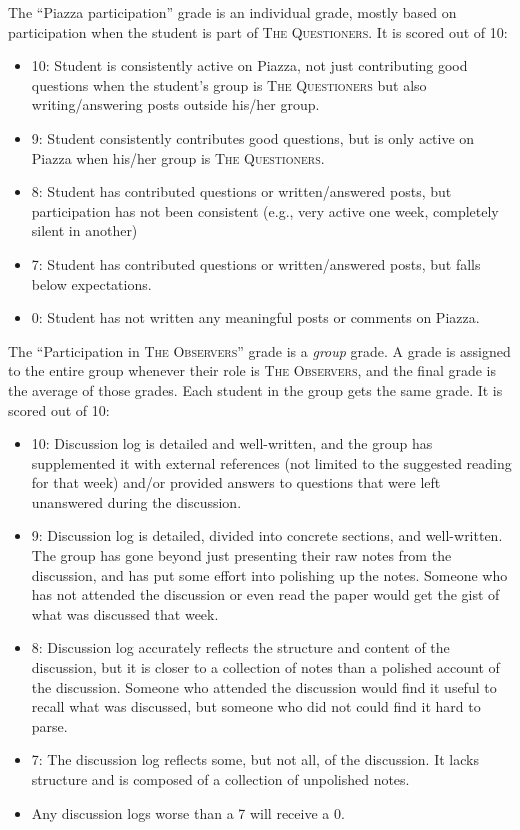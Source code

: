 \documentclass[11pt]{article}
\begin{document}
The ``Piazza participation'' grade is an individual grade, mostly based on participation when the student is part of \textsc{The Questioners}. It is scored out of 10:
 
\begin{itemize}
\item 10: Student is consistently active on Piazza, not just contributing good questions when the student's group is \textsc{The Questioners} but also writing/answering posts outside his/her group.
\item 9: Student consistently contributes good questions, but is only active on Piazza when his/her group is \textsc{The Questioners}.
\item 8: Student has contributed questions or written/answered posts, but participation has not been consistent (e.g., very active one week, completely silent in another)
\item 7: Student has contributed questions or written/answered posts, but falls below expectations.
\item 0: Student has not written any meaningful posts or comments on Piazza.
\end{itemize}

The ``Participation in \textsc{The Observers}'' grade is a \emph{group} grade. A grade is assigned to the entire group whenever their role is \textsc{The Observers}, and the final grade is the average of those grades. Each student in the group gets the same grade. It is scored out of 10:

\begin{itemize}
\item 10: Discussion log is detailed and well-written, and the group has supplemented it with external references (not limited to the suggested reading for that week) and/or provided answers to questions that were left unanswered during the discussion.
\item 9: Discussion log is detailed, divided into concrete sections, and well-written. The group has gone beyond just presenting their raw notes from the discussion, and has put some effort into polishing up the notes. Someone who has not attended the discussion or even read the paper would get the gist of what was discussed that week.
\item 8: Discussion log accurately reflects the structure and content of the discussion, but it is closer to a collection of notes than a polished account of the discussion. Someone who attended the discussion would find it useful to recall what was discussed, but someone who did not could find it hard to parse.
\item 7: The discussion log reflects some, but not all, of the discussion. It lacks structure and is composed of a collection of unpolished notes.
\item Any discussion logs worse than a 7 will receive a 0.
\end{itemize}
\end{document}
